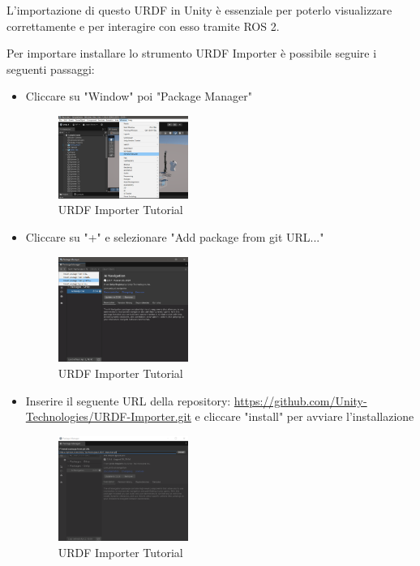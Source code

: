 \documentclass[11pt]{report}
\begin{document}
L'importazione di questo URDF in Unity è essenziale per poterlo visualizzare correttamente e per interagire con esso tramite ROS 2.

Per importare installare lo strumento URDF Importer è possibile seguire i seguenti passaggi:
\begin{itemize}
    \item Cliccare su "Window" poi "Package Manager"
    \begin{figure}[H]
        \centering
        \includegraphics[width=0.4\textwidth]{images/URDF_Importer_1.png}
        \caption{URDF Importer Tutorial}
        \label{fig:URDF_Importer_1}
    \end{figure}
    \item Cliccare su "+" e selezionare "Add package from git URL..."
    \begin{figure}[H]
        \centering
        \includegraphics[width=0.4\textwidth]{images/URDF_Importer_2.png}
        \caption{URDF Importer Tutorial}
        \label{fig:URDF_Importer_2}
    \end{figure}
    \item Inserire il seguente URL della repository: 
    \url{https://github.com/Unity-Technologies/URDF-Importer.git} e cliccare "install" per avviare l'installazione
    \begin{figure}[H]
        \centering
        \includegraphics[width=0.4\textwidth]{images/URDF_Importer_3.png}
        \caption{URDF Importer Tutorial}
        \label{fig:URDF_Importer_3}
    \end{figure}
\end{itemize}
\end{document}
